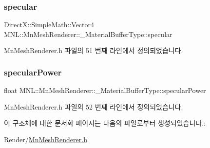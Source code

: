 \subsubsection{\texorpdfstring{specular}{specular}}
{\footnotesize\ttfamily Direct\+X\+::\+Simple\+Math\+::\+Vector4 M\+N\+L\+::\+Mn\+Mesh\+Renderer\+::\+\_\+\+Material\+Buffer\+Type\+::specular}



Mn\+Mesh\+Renderer.\+h 파일의 51 번째 라인에서 정의되었습니다.

\mbox{\label{struct_m_n_l_1_1_mn_mesh_renderer_1_1___material_buffer_type_a6c5c3373b1f35531a3f0d7fd6afc819e}} 
\subsubsection{\texorpdfstring{specular\+Power}{specularPower}}
{\footnotesize\ttfamily float M\+N\+L\+::\+Mn\+Mesh\+Renderer\+::\+\_\+\+Material\+Buffer\+Type\+::specular\+Power}



Mn\+Mesh\+Renderer.\+h 파일의 52 번째 라인에서 정의되었습니다.



이 구조체에 대한 문서화 페이지는 다음의 파일로부터 생성되었습니다.\+:\begin{DoxyCompactItemize}
\item 
Render/\hyperlink{_mn_mesh_renderer_8h}{Mn\+Mesh\+Renderer.\+h}\end{DoxyCompactItemize}

